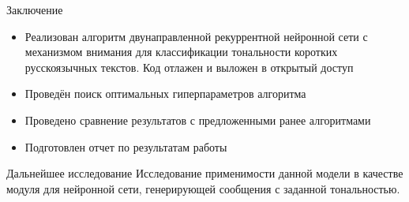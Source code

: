 \documentclass{beamer}
\begin{document}
\begin{frame}{Заключение}

	\begin{itemize}
		\item Реализован алгоритм двунаправленной рекуррентной нейронной сети с механизмом внимания для классификации тональности коротких русскоязычных текстов. Код отлажен и выложен в открытый доступ
		\item Проведён поиск оптимальных гиперпараметров алгоритма
		\item Проведено сравнение результатов с предложенными ранее алгоритмами
		\item Подготовлен отчет по результатам работы
	\end{itemize}

	\begin{block}{Дальнейшее исследование}
		Исследование применимости данной модели в качестве модуля для нейронной сети, генерирующей сообщения с заданной тональностью.
	\end{block}
\end{frame}
\end{document}
